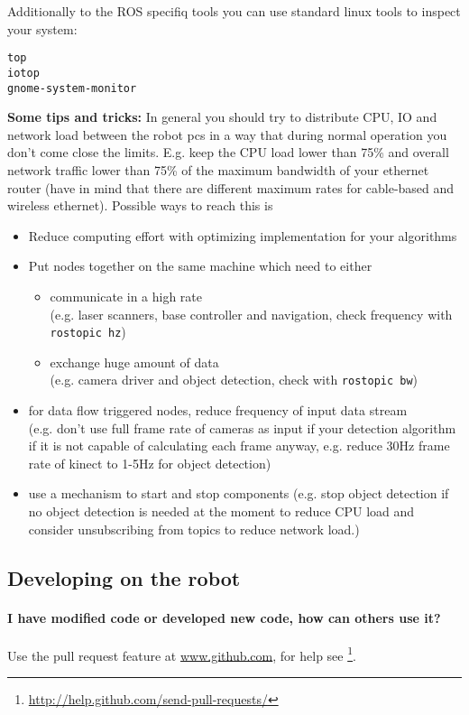 Additionally to the ROS specifiq tools you can use standard linux tools to inspect your system:
\begin{lstlisting}
top
iotop
gnome-system-monitor
\end{lstlisting}

\textbf{Some tips and tricks:} In general you should try to distribute CPU, IO and network load between the robot pcs in a way that during normal operation you don't come close the limits. E.g. keep the CPU load lower than 75\% and overall network traffic lower than 75\% of the maximum bandwidth of your ethernet router (have in mind that there are different maximum rates for cable-based and wireless ethernet). Possible ways to reach this is
\begin{itemize}
\item Reduce computing effort with optimizing implementation for your algorithms
\item Put nodes together on the same machine which need to either 
\begin{itemize}
  \item communicate in a high rate \\
  (e.g. laser scanners, base controller and navigation, check frequency with \texttt{rostopic hz})
  \item exchange huge amount of data \\
  (e.g. camera driver and object detection, check with \texttt{rostopic bw})
\end{itemize}
\item for data flow triggered nodes, reduce frequency of input data stream\\
(e.g. don't use full frame rate of cameras as input if your detection algorithm if it is not capable of calculating each frame anyway, e.g. reduce 30Hz frame rate of kinect to 1-5Hz for object detection)
\item use a mechanism to start and stop components
(e.g. stop object detection if no object detection is needed at the moment to reduce CPU load and consider unsubscribing from topics to reduce network load.)
\end{itemize}


\subsection{Developing on the robot}
\paragraph{I have modified code or developed new code, how can others use it?}
Use the pull request feature at \url{www.github.com}, for help see \footnote{\url{http://help.github.com/send-pull-requests/}}.

